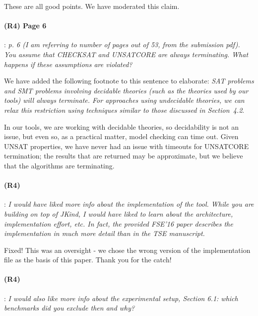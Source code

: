 \documentclass{article}
\begin{document}
These are all good points.  We have moderated this claim.  

\paragraph{(R4) Page 6}: \textit{p. 6 (I am referring to number of pages out of 53, from the submission pdf). You assume that CHECKSAT and UNSATCORE are
always terminating. What happens if these assumptions are violated?}
\vspace{0.05in}

\noindent We have added the following footnote to this sentence to elaborate: \textit{SAT problems and SMT problems involving decidable theories (such as the theories used by our tools) will always terminate.  For approaches using undecidable theories, we can relax this restriction using  techniques similar to those discussed in Section~4.2}.

In our tools, we are working with decidable theories, so decidability is not an issue, but even so, as a practical matter, model checking can time out.  Given UNSAT properties, we have never had an issue with timeouts for UNSATCORE termination; the results that are returned may be approximate, but we believe that the algorithms are terminating.

\paragraph{(R4)}: \textit{I would have liked more info about the implementation of the tool. While you are building on top of JKind, I would have liked to learn about the architecture, implementation effort, etc. In fact, the provided FSE'16 paper describes the implementation in much more detail than in the TSE manuscript.}
\vspace{0.05in}

Fixed!  This was an oversight - we chose the wrong version of the implementation file as the basis of this paper.  Thank you for the catch!

\paragraph{(R4)}: \textit{I would also like more info about the experimental setup, Section 6.1: which benchmarks did you exclude then and why?}
\vspace{0.05in}

\end{document}

